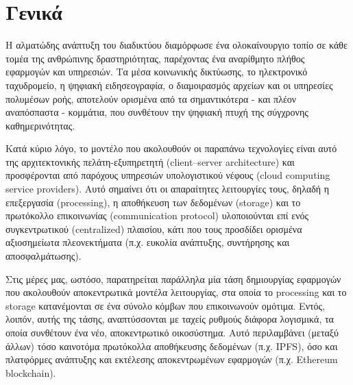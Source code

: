 \section{Γενικά}

Η αλματώδης ανάπτυξη του διαδικτύου διαμόρφωσε ένα ολοκαίνουργιο τοπίο σε κάθε τομέα της ανθρώπινης δραστηριότητας, παρέχοντας ένα αναρίθμητο πλήθος εφαρμογών και υπηρεσιών. Τα μέσα κοινωνικής δικτύωσης,
το ηλεκτρονικό ταχυδρομείο, η ψηφιακή ειδησεογραφία, ο διαμοιρασμός αρχείων και
οι υπηρεσίες πολυμέσων ροής, αποτελούν ορισμένα από τα σημαντικότερα - και πλέον αναπόσπαστα - κομμάτια,
που συνθέτουν την ψηφιακή πτυχή της σύγχρονης καθημερινότητας. 

Κατά κύριο λόγο, το μοντέλο που ακολουθούν οι παραπάνω τεχνολογίες είναι αυτό της αρχιτεκτονικής πελάτη-εξυπηρετητή (client–server architecture) και προσφέρονται από παρόχους υπηρεσιών υπολογιστικού νέφους (cloud computing service providers). Αυτό σημαίνει ότι οι απαραίτητες λειτουργίες τους, δηλαδή η επεξεργασία (processing), η αποθήκευση των δεδομένων (storage) και το πρωτόκολλο επικοινωνίας (communication protocol) υλοποιούνται επί ενός συγκεντρωτικού (centralized) πλαισίου, κάτι που τους προσδίδει ορισμένα αξιοσημείωτα πλεονεκτήματα (π.χ. ευκολία ανάπτυξης, συντήρησης και αποσφαλμάτωσης).

Στις μέρες μας, ωστόσο, παρατηρείται παράλληλα μία τάση δημιουργίας εφαρμογών που ακολουθούν αποκεντρωτικά μοντέλα λειτουργίας, στα οποία το processing και το storage κατανέμονται σε ένα σύνολο κόμβων που επικοινωνούν ομότιμα. Εντός, λοιπόν, αυτής της τάσης, αναπτύσσονται με ταχείς ρυθμούς διάφορα λογισμικά, τα οποία συνθέτουν ένα νέο, αποκεντρωτικό οικοσύστημα. Αυτό περιλαμβάνει (μεταξύ άλλων) τόσο καινοτόμα πρωτόκολλα αποθήκευσης δεδομένων (π.χ. IPFS), όσο και πλατφόρμες ανάπτυξης και εκτέλεσης αποκεντρωμένων εφαρμογών (π.χ. Ethereum blockchain).

\newpage